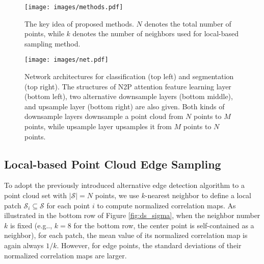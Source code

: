 \documentclass[10pt,twocolumn,letterpaper]{article}
\makeatletter
\newcommand{\cS}{\mathcal{S}}
\DeclareRobustCommand\onedot{\futurelet\@let@token\@onedot}
\def\@onedot{\ifx\@let@token.\else.\null\fi\xspace}
\def\eg{e.g\onedot} \def\Eg{E.g\onedot}
\makeatother
\begin{document}
\begin{figure}[t]
    \centering
    \texttt{[image: images/methods.pdf]}
    \caption{The key idea of proposed methods. $N$ denotes the total number of points, while $k$ denotes the number of neighbors used for local-based sampling method. \vspace{-0.2cm}}
    \label{fig:methods}
\end{figure}

\begin{figure*}[t]
    \centering
    \texttt{[image: images/net.pdf]}
    \caption{Network architectures for classification (top left) and segmentation (top right). The structures of N2P attention feature learning layer (bottom left), two alternative downsample layers (bottom middle), and upsample layer (bottom right) are also given. Both kinds of downsample layers downsample a point cloud from $N$ points to $M$ points, while upsample layer upsamples it from $M$ points to $N$ points.}
    \label{fig:net}
\end{figure*}


\subsection{Local-based Point Cloud Edge Sampling}
To adopt the previously introduced alternative edge detection algorithm to a point cloud set with $|\cS|=N$ points, we use $k$-nearest neighbor to define a local patch $\cS_i\subseteq \cS$ for each point $i$ to compute normalized correlation maps. 
As illustrated in the bottom row of Figure \ref{fig:ds_sigma}, when the neighbor number $k$ is fixed (\eg, $k=8$ for the bottom row, the center point is self-contained as a neighbor), for each patch, the mean value of its normalized correlation map is again always $1/k$. However, for edge points, the standard deviations of their normalized correlation maps are larger.
\end{document}
